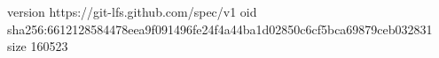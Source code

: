 version https://git-lfs.github.com/spec/v1
oid sha256:6612128584478eea9f091496fe24f4a44ba1d02850c6cf5bca69879ceb032831
size 160523
